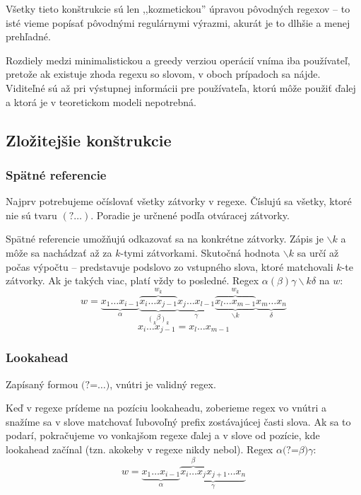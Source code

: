 \documentclass{svk_long_sk}
\def\lookahead{\text{(?=}}
\begin{document}
Všetky tieto konštrukcie sú len ,,kozmetickou'' úpravou pôvodných regexov -- to isté vieme popísať pôvodnými regulárnymi výrazmi, akurát je to dlhšie a menej prehľadné.

Rozdiely medzi minimalistickou a greedy verziou operácií vníma iba používateľ, pretože ak existuje zhoda regexu so slovom, v oboch prípadoch sa nájde. Viditeľné sú až pri výstupnej informácii pre používateľa, ktorú môže použiť ďalej a ktorá je v teoretickom modeli nepotrebná.

\subsection{Zložitejšie konštrukcie}
\subsubsection*{Spätné referencie}
Najprv potrebujeme očíslovať všetky zátvorky v regexe. Číslujú sa všetky, ktoré nie sú tvaru $(?\dots)$. Poradie je určnené podľa otváracej zátvorky.

Spätné referencie umožňujú odkazovať sa na konkrétne zátvorky. Zápis je $\backslash k$ a môže sa nachádzať až za $k$-tymi zátvorkami. Skutočná hodnota $\backslash k$ sa určí až počas výpočtu -- predstavuje podslovo zo vstupného slova, ktoré matchovali $k$-te zátvorky. Ak je takých viac, platí vždy to posledné. Regex $\alpha(\beta)\gamma\backslash k\delta$ na $w$:
$$w = \underbrace{x_1\dots x_{i-1}}_\alpha 
 \overbrace{\underbrace{x_i\dots x_{j-1}}_{ \displaystyle{\mathop(_k\beta \mathop)_k}}}^{w_k} 
 \underbrace{x_j\dots x_{l-1}}_\gamma 
 \overbrace{\underbrace{x_l\dots x_{m-1}}_{\backslash k}}^{w_k}
 \underbrace{x_{m}\dots x_{n}}_\delta$$
 $$ x_i\dots x_{j-1} = x_l\dots x_{m-1} $$

\subsubsection*{Lookahead}
Zapísaný formou $\lookahead \dots)$, vnútri je validný regex.

Keď v regexe prídeme na pozíciu lookaheadu, zoberieme regex vo vnútri a snažíme sa v slove matchovať ľubovoľný prefix zostávajúcej časti slova. Ak sa to podarí, pokračujeme vo vonkajšom regexe ďalej a v slove od pozície, kde lookahead začínal (tzn. akokeby v regexe nikdy nebol).
Regex $\alpha\lookahead\beta)\gamma$:
 $$w = \underbrace{x_1\dots x_{i-1}}_\alpha \underbrace{\overbrace{x_i \dots x_j}^\beta x_{j+1} \dots x_n }_\gamma$$ 
\end{document}
